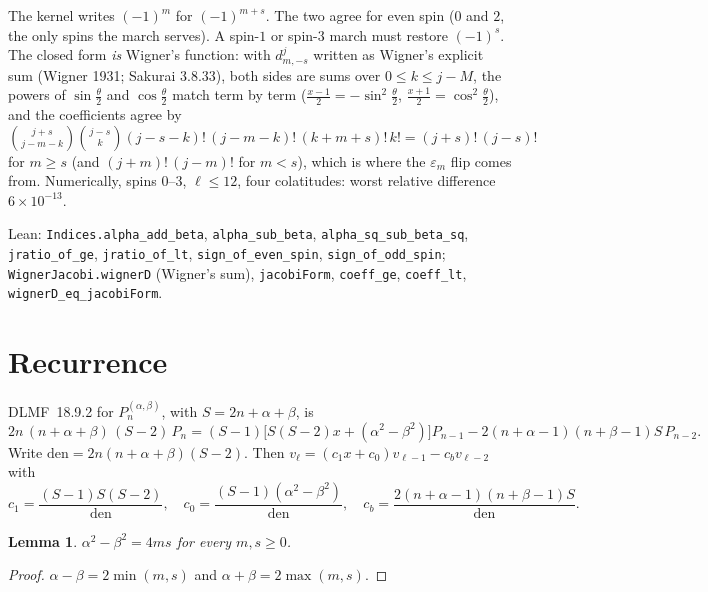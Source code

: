 \documentclass[11pt,a4paper]{article}
\newtheorem{lemma}[theorem]{Lemma}
\numberwithin{equation}{section}
\begin{document}
The kernel writes $(-1)^m$ for $(-1)^{m+s}$.  The two agree for even spin
($0$ and $2$, the only spins the march serves).  A spin-$1$ or spin-$3$
march must restore $(-1)^s$.  The closed form \emph{is} Wigner's function:
with $d^j_{m,-s}$ written as Wigner's explicit sum (Wigner 1931; Sakurai
3.8.33), both sides are sums over $0\le k\le j-M$, the powers of
$\sin\frac{\theta}{2}$ and $\cos\frac{\theta}{2}$ match term by term
($\tfrac{x-1}{2}=-\sin^2\frac{\theta}{2}$, $\tfrac{x+1}{2}=\cos^2\frac{\theta}{2}$),
and the coefficients agree by
$\binom{j+s}{j-m-k}\binom{j-s}{k}(j-s-k)!\,(j-m-k)!\,(k+m+s)!\,k!=(j+s)!\,(j-s)!$
for $m\ge s$ (and $(j+m)!\,(j-m)!$ for $m<s$), which is where the
$\varepsilon_m$ flip comes from.  Numerically, spins $0$--$3$, $\ell\le 12$,
four colatitudes: worst relative difference $6\times 10^{-13}$.

Lean: \texttt{Indices.alpha\_add\_beta}, \texttt{alpha\_sub\_beta},
\texttt{alpha\_sq\_sub\_beta\_sq}, \texttt{jratio\_of\_ge},
\texttt{jratio\_of\_lt}, \texttt{sign\_of\_even\_spin},
\texttt{sign\_of\_odd\_spin}; \texttt{WignerJacobi.wignerD} (Wigner's sum),
\texttt{jacobiForm}, \texttt{coeff\_ge}, \texttt{coeff\_lt},
\texttt{wignerD\_eq\_jacobiForm}.

\section{Recurrence}
\label{sec:rec}

DLMF~18.9.2 for $P_n^{(\alpha,\beta)}$, with $S=2n+\alpha+\beta$, is
\begin{equation}
\label{eq:dlmf}
2n\,(n+\alpha+\beta)\,(S-2)\,P_n
  =(S-1)\bigl[S(S-2)x+(\alpha^2-\beta^2)\bigr]P_{n-1}
   -2(n+\alpha-1)(n+\beta-1)S\,P_{n-2}.
\end{equation}
Write $\mathrm{den}=2n(n+\alpha+\beta)(S-2)$.  Then
$v_\ell=(c_1 x+c_0)v_{\ell-1}-c_b v_{\ell-2}$ with
\begin{equation}
\label{eq:c}
c_1=\frac{(S-1)S(S-2)}{\mathrm{den}},
\quad
c_0=\frac{(S-1)(\alpha^2-\beta^2)}{\mathrm{den}},
\quad
c_b=\frac{2(n+\alpha-1)(n+\beta-1)S}{\mathrm{den}}.
\end{equation}

\begin{lemma}
\label{lem:c0}
$\alpha^2-\beta^2=4ms$ for every $m,s\ge 0$.
\end{lemma}

\begin{proof}
$\alpha-\beta=2\min(m,s)$ and $\alpha+\beta=2\max(m,s)$.
\end{proof}
\end{document}
